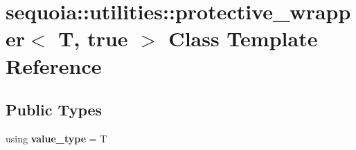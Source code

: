 \hypertarget{classsequoia_1_1utilities_1_1protective__wrapper_3_01_t_00_01true_01_4}{}\section{sequoia\+::utilities\+::protective\+\_\+wrapper$<$ T, true $>$ Class Template Reference}
\label{classsequoia_1_1utilities_1_1protective__wrapper_3_01_t_00_01true_01_4}
\subsection*{Public Types}
\begin{DoxyCompactItemize}
\item 
\mbox{\label{classsequoia_1_1utilities_1_1protective__wrapper_3_01_t_00_01true_01_4_a070b2fa198cda92344bdf2913064af07}} 
using {\bfseries value\+\_\+type} = T
\end{DoxyCompactItemize}
